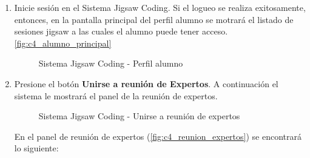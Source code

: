\begin{enumerate}
	\item Inicie sesión en el Sistema Jigsaw Coding. Si el logueo se realiza exitosamente, entonces, en la pantalla principal del perfil alumno se motrará el listado de sesiones jigsaw a las cuales el alumno puede tener acceso. \autoref{fig:c4_alumno_principal}
	
	\begin{figure}
		\centering
		\caption{Sistema Jigsaw Coding - Perfil alumno}
		\label{fig:c4_alumno_principal}
	\end{figure}
	
	\item Presione el botón \textbf{Unirse a reunión de Expertos}. A continuación el sistema le mostrará el panel de la reunión de expertos. 
	
	\begin{figure}
		\centering
		\caption{Sistema Jigsaw Coding - Unirse a reunión de expertos}
		\label{fig:c4_reunion_expertos}
	\end{figure}
	
	En el panel de reunión de expertos (\autoref{fig:c4_reunion_expertos}) se encontrará lo siguiente: 


\end{enumerate}
